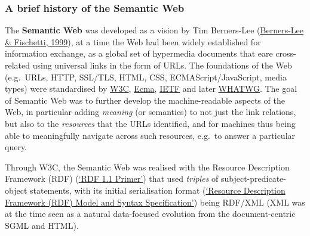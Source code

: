\hypertarget{sec:semweb}{%
\subsubsection{A brief history of the Semantic Web}\label{sec:semweb}}

The \textbf{Semantic Web} was developed as a vision by Tim Berners-Lee (\protect\hyperlink{ref-Guy7cjVY}{Berners-Lee \& Fischetti, 1999}), at a time the Web had been widely established for information exchange, as a global set of hypermedia documents that eare cross-related using universal links in the form of URLs. The foundations of the Web (e.g.~URLs, HTTP, SSL/TLS, HTML, CSS, ECMAScript/JavaScript, media types) were standardised by \href{https://www.w3.org/standards/}{W3C}, \href{https://www.ecma-international.org/}{Ecma}, \href{https://www.ietf.org/standards/}{IETF} and later \href{https://whatwg.org/}{WHATWG}. The goal of Semantic Web was to further develop the machine-readable aspects of the Web, in particular adding \emph{meaning} (or semantics) to not just the link relations, but also to the \emph{resources} that the URLs identified, and for machines thus being able to meaningfully navigate across such resources, e.g.~to answer a particular query.

Through W3C, the Semantic Web was realised with the Resource Description Framework (RDF) (\protect\hyperlink{ref-16WGmCih8}{{`RDF 1.1 Primer'}}) that used \emph{triples} of subject-predicate-object statements, with its initial serialisation format (\protect\hyperlink{ref-16wvFH4nh}{{`Resource Description Framework (RDF) Model and Syntax Specification'}}) being RDF/XML (XML was at the time seen as a natural data-focused evolution from the document-centric SGML and HTML).

